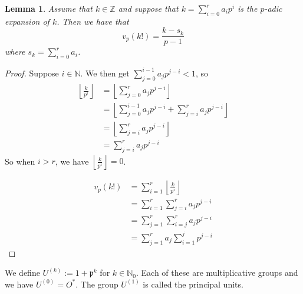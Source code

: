 \documentclass{article}
\newtheorem{lemma}{Lemma}[section]
\newcommand{\mfrak}[1]{\mathfrak{#1}}
\newcommand{\mbb}[1]{\mathbb{#1}}
\begin{document}
\begin{lemma}
    Assume that $k \in \mbb Z$ and suppose that $k = \sum_{i = 0}^{r} a_i p^i$ is the $p$-adic expansion of $k$. Then we have that 
    $$v_p(k!) = \frac{k - s_k}{p - 1}$$
    where $s_k = \sum_{i = 0}^{r} a_i$.
\end{lemma}
\begin{proof}
    Suppose $i \in \mbb N$. We then get $\sum_{j = 0}^{i-1}a_j p^{j-i} < 1$, so
    \begin{align*}
        \left\lfloor \frac{k}{p^i} \right \rfloor &= \left \lfloor \sum_{j = 0}^{r} a_j p^{j-i} \right \rfloor \\ 
        &= \left \lfloor \sum_{j = 0}^{i-1}a_j p^{j-i} + \sum_{j=i}^{r} a_j p^{j-i} \right \rfloor \\
        &=  \left \lfloor \sum_{j=i}^{r} a_j p^{j-i} \right \rfloor \\
        &= \sum_{j=i}^{r} a_j p^{j-i}
    \end{align*}
    So when $i > r$, we have $\left\lfloor \frac{k}{p^i} \right \rfloor = 0$.
    
    
    \begin{align*}
        v_p(k!) &= \sum_{i = 1}^{r} \left\lfloor \frac{k}{p^i} \right \rfloor \\
        &= \sum_{i = 1}^{r} \sum_{j=i}^{r} a_j p^{j-i} \\ 
        &= \sum_{j=1}^{r} \sum_{i = j}^{r} a_j p^{j-i} \\
        &= \sum_{j=1}^{r} a_j \sum_{i = 1}^{j} p^{j-i}
    \end{align*}


\end{proof}

We define $U^{(k)} := 1 + \mfrak p^k$ for $k \in \mbb N_0$. Each of these are multiplicative groups and we have $U^{(0)} = O^*$. The group $U^{(1)}$ is called the principal units.
\end{document}

